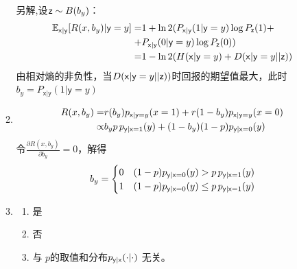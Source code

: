 \documentclass[a4paper]{article}
\begin{document}
\begin{enumerate}[label=\thehwcnt.\arabic*.]
\begin{enumerate}[label=(\alph*)]
   另解,设$\mathsf{z}\sim B(b_y)$：
   \begin{align*}
     \operatorname{\mathbb{E}}_{\mathsf{x}|\mathsf{y}}[R(x,b_y)|\mathsf{y}=y] = & 1+ \ln 2(P_{\mathsf{x}|\mathsf{y}}(1|\mathsf{y}=y) \log P_{\mathsf{z}}(1) +\\
     + & P_{\mathsf{x}|\mathsf{y}}(0|\mathsf{y}=y)\log P_{\mathsf{z}}(0))\\
     = & 1-\ln 2(H(\mathsf{x}|\mathsf{y}=y)+D(\mathsf{x}|\mathsf{y}=y||\mathsf{z}))
   \end{align*}
   由相对熵的非负性，当$D(\mathsf{x}|\mathsf{y}=y||\mathsf{z}))$时回报的期望值最大，此时$b_y=P_{\mathsf{x}|\mathsf{y}}(1|\mathsf{y}=y)$
  \item
   \begin{align*} 
      R(x,b_y) = & r(b_y)p_{\mathsf{x}|\mathsf{y}=y}(x=1)+r(1-b_y)p_{\mathsf{x}|\mathsf{y}=y}(x=0) \\
      \propto & b_y p\, p_{\mathsf{y}| \mathsf{x}=1}(y)+(1-b_y)(1-p) p_{\mathsf{y}| \mathsf{x}=0}(y)
   \end{align*}
   令$\frac{\partial R(x,b_y)}{\partial b_y}=0$，解得
   \begin{equation}
      b_y=\begin{cases}
       0 & (1-p) p_{\mathsf{y}| \mathsf{x}=0}(y)>p\, p_{\mathsf{y}| \mathsf{x}=1}(y)\\
       1 & (1-p) p_{\mathsf{y}| \mathsf{x}=0}(y)\leq p\, p_{\mathsf{y}| \mathsf{x}=1}(y)
          \end{cases}
   \end{equation}
  \item
  \begin{enumerate}[label=\roman*.]
  \item 
   是  
  \item
   否
  \item
  与 $p$的取值和分布$p_{\mathsf{y} | \mathsf{x} }(\cdot | \cdot)$ 无关。
  \end{enumerate}


\end{enumerate}
\end{enumerate}
\end{document}
